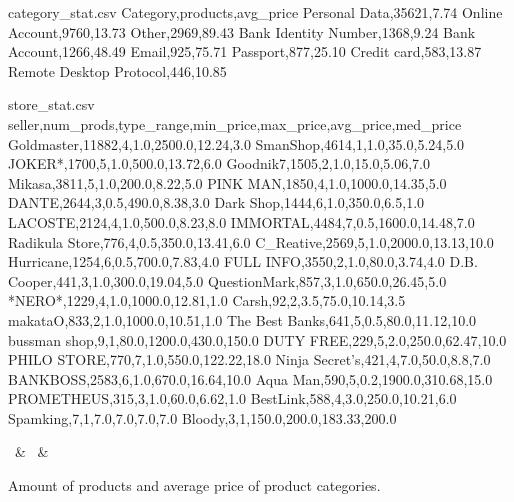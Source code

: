 \begin{filecontents*}[overwrite]{category_stat.csv}
Category,products,avg_price
Personal Data,35621,7.74
Online Account,9760,13.73
Other,2969,89.43
Bank Identity Number,1368,9.24
Bank Account,1266,48.49
Email,925,75.71
Passport,877,25.10
Credit card,583,13.87
Remote Desktop Protocol,446,10.85
\end{filecontents*}

\begin{filecontents*}[overwrite]{store_stat.csv}
seller,num_prods,type_range,min_price,max_price,avg_price,med_price
Goldmaster,11882,4,1.0,2500.0,12.24,3.0
SmanShop,4614,1,1.0,35.0,5.24,5.0
JOKER*,1700,5,1.0,500.0,13.72,6.0
Goodnik7,1505,2,1.0,15.0,5.06,7.0
Mikasa,3811,5,1.0,200.0,8.22,5.0
PINK MAN,1850,4,1.0,1000.0,14.35,5.0
DANTE,2644,3,0.5,490.0,8.38,3.0
Dark Shop,1444,6,1.0,350.0,6.5,1.0
LACOSTE,2124,4,1.0,500.0,8.23,8.0
IMMORTAL,4484,7,0.5,1600.0,14.48,7.0
Radikula Store,776,4,0.5,350.0,13.41,6.0
C_Reative,2569,5,1.0,2000.0,13.13,10.0
Hurricane,1254,6,0.5,700.0,7.83,4.0
FULL INFO,3550,2,1.0,80.0,3.74,4.0
D.B. Cooper,441,3,1.0,300.0,19.04,5.0
QuestionMark,857,3,1.0,650.0,26.45,5.0
*NERO*,1229,4,1.0,1000.0,12.81,1.0
Carsh,92,2,3.5,75.0,10.14,3.5
makataO,833,2,1.0,1000.0,10.51,1.0
The Best Banks,641,5,0.5,80.0,11.12,10.0
bussman shop,9,1,80.0,1200.0,430.0,150.0
DUTY FREE,229,5,2.0,250.0,62.47,10.0
PHILO STORE,770,7,1.0,550.0,122.22,18.0
Ninja Secret's,421,4,7.0,50.0,8.8,7.0
BANKBOSS,2583,6,1.0,670.0,16.64,10.0
Aqua Man,590,5,0.2,1900.0,310.68,15.0
PROMETHEUS,315,3,1.0,60.0,6.62,1.0
BestLink,588,4,3.0,250.0,10.21,6.0
Spamking,7,1,7.0,7.0,7.0,7.0
Bloody,3,1,150.0,200.0,183.33,200.0
\end{filecontents*}

\begin{table*}[]
    \centering
    {\cate\ & \amount\ & \avg}%
    \caption{Amount of products and average price of product categories.}\label{tab:category_stat}
\end{table*}

